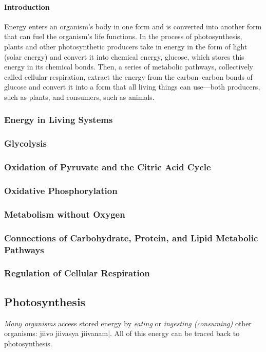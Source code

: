 \documentclass[12pt]{article}
\begin{document}
\paragraph{Introduction}
Energy enters an organism’s body in one form and is converted into another form that can fuel the organism’s life functions. In the process of photosynthesis, plants and other photosynthetic producers take in energy in the form of light (solar energy) and convert it into chemical energy, glucose, which stores this energy in its chemical bonds. Then, a series of metabolic pathways, collectively called cellular respiration, extract the energy from the carbon–carbon bonds of glucose and convert it into a form that all living things can use—both producers, such as plants, and consumers, such as animals.
\subsubsection{Energy in Living Systems}
\subsubsection{Glycolysis}
\subsubsection{Oxidation of Pyruvate and the Citric Acid Cycle}
\subsubsection{Oxidative Phosphorylation}
\subsubsection{Metabolism without Oxygen}
\subsubsection{Connections of Carbohydrate, Protein, and Lipid Metabolic Pathways}
\subsubsection{Regulation of Cellular Respiration}
\subsection{Photosynthesis}
\emph{Many organisms} access stored energy by \emph{eating} or \emph{ingesting (consuming)} other organisms: \textmarathi{jiivo jiivasya jiivanam|}. All of this energy can be traced back to photosynthesis.
\end{document}
